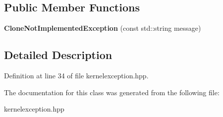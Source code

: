 \subsection*{Public Member Functions}
\begin{DoxyCompactItemize}
\item 
\hypertarget{class_clone_not_implemented_exception_a079b0f22e6fc12f2bdd7fa10dd906c3a}{}\label{class_clone_not_implemented_exception_a079b0f22e6fc12f2bdd7fa10dd906c3a} 
{\bfseries Clone\+Not\+Implemented\+Exception} (const std\+::string message)
\end{DoxyCompactItemize}


\subsection{Detailed Description}


Definition at line 34 of file kernelexception.\+hpp.



The documentation for this class was generated from the following file\+:\begin{DoxyCompactItemize}
\item 
kernelexception.\+hpp\end{DoxyCompactItemize}
